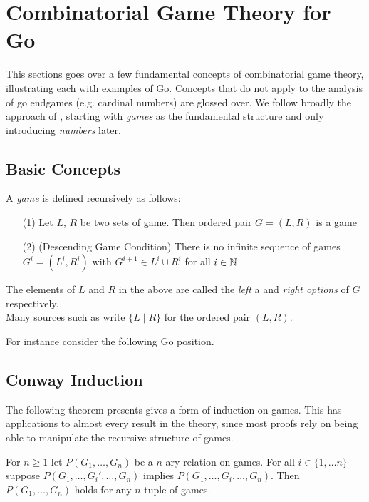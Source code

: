 \documentclass[../math194_paper.tex]{subfiles}
\begin{document}
\section{Combinatorial Game Theory for Go}

This sections goes over a few fundamental concepts of combinatorial game 
theory, illustrating each with examples of Go. Concepts that do not apply 
to the analysis of go endgames (e.g. cardinal numbers) are glossed over.
We follow broadly the approach of \cite{schleicher2006introduction}, starting 
with \textit{games} as the fundamental structure and only introducing 
\textit{numbers} later.

\subsection{Basic Concepts}

\begin{definition}[Game] 
    A \textit{game} is defined recursively as follows:
    \begin{itemize}
        \item[(1)] Let $L$, $R$ be two sets of game. Then ordered pair $G = (L, R)$ is a 
        game  
        \item[(2)] (Descending Game Condition) There is no infinite sequence of games  
        $G^i = (L^i, R^i)$ with $G^{i+1} \in L^i \cup R^i$ for all $i \in \mathbb{N}$
    \end{itemize}
\end{definition}
The elements of $L$ and $R$ in the above are called the \textit{left} a and \textit{right options}
of $G$ respectively. \\
Many sources such as \cite{berlekamp1994mathematical} write $\{L \mid R\}$ for the ordered pair 
$(L,R)$. 

For instance consider the following Go position. 

\subsection{Conway Induction}

The following theorem presents gives a form of induction on games. 
This has applications to almost every result in the theory, since most 
proofs rely on being able to manipulate the recursive structure of games.

\begin{theorem}
\label{induction}
For $n \geq 1$ let $P(G_1, \ldots, G_n)$ be a $n$-ary relation on games.
For all $i \in \{1, \ldots n\}$ suppose $P(G_1, \ldots, G_i', \ldots, G_n)$ implies 
$P(G_1, \ldots, G_i, \ldots, G_n)$. Then $P(G_1, \ldots, G_n)$ holds for any $n$-tuple 
of games.
\end{theorem}
\end{document}

